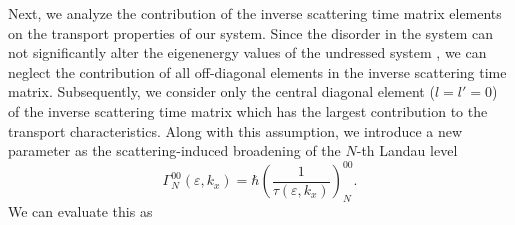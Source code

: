 \documentclass[
 reprint,
 amsmath,amssymb,
 aps,
 prb,
]{revtex4-2}
\begin{document}
Next, we analyze the contribution of the inverse scattering time matrix elements on the transport properties of our system.
Since the disorder in the system can not significantly alter the eigenenergy values of the undressed system \cite{wackerl20}, we can neglect the contribution of all off-diagonal elements in the inverse scattering time matrix. Subsequently, we consider only the central diagonal element (${l=l'=0}$) of the inverse scattering time matrix which has the largest contribution to the transport characteristics. Along with this assumption, we introduce a new parameter as the scattering-induced broadening of the $N$-th Landau level \cite{dini16,endo09}
\begin{equation} \label{eq:16}
 \Gamma^{00}_{N}(\varepsilon,k_x) =
 \hbar \left(\frac{1}{\tau(\varepsilon,k_x)}\right)^{00}_N.
\end{equation}
We can evaluate this as
\end{document}
